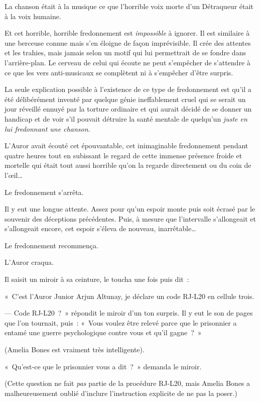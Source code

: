 La chanson était à la musique ce que l'horrible voix morte d'un Détraqueur était à la voix humaine.

Et cet horrible, horrible fredonnement est \emph{impossible} à ignorer. Il est similaire à une berceuse connue mais s'en éloigne de façon imprévisible. Il crée des attentes et les trahies, mais jamais selon un motif qui lui permettrait de se fondre dans l'arrière-plan. Le cerveau de celui qui écoute ne peut s'empêcher de s'attendre à ce que les vers anti-musicaux se complètent ni à s'empêcher d'être surpris.

La seule explication possible à l'existence de ce type de fredonnement est qu'il a été délibérément inventé par quelque génie ineffablement cruel qui se serait un jour réveillé ennuyé par la torture ordinaire et qui aurait décidé de se donner un handicap et de voir s'il pouvait détruire la santé mentale de quelqu'un \emph{juste en lui fredonnant une chanson.}

L'Auror avait écouté cet épouvantable, cet inimaginable fredonnement pendant quatre heures tout en subissant le regard de cette immense présence froide et mortelle qui était tout aussi horrible qu'on la regarde directement ou du coin de l'œil…

Le fredonnement s'arrêta.

Il y eut une longue attente. Assez pour qu'un espoir monte puis soit écrasé par le souvenir des déceptions précédentes. Puis, à mesure que l'intervalle s'allongeait et s'allongeait encore, cet espoir s'éleva de nouveau, inarrêtable…

Le fredonnement recommença.

L'Auror craqua.

Il saisit un miroir à sa ceinture, le toucha une fois puis dit~:

«~C'est l'Auror Junior Arjun Altunay, je déclare un code RJ-L20 en cellule trois.

--- Code RJ-L20~?~» répondit le miroir d'un ton surpris. Il y eut le son de pages que l'on tournait, puis~: «~Vous voulez être relevé parce que le prisonnier a entamé une guerre psychologique contre vous et qu'il gagne~?~»

(Amelia Bones est vraiment très intelligente).

«~Qu'est-ce que le prisonnier vous a dit~?~» demanda le miroir.

(Cette question ne fait \emph{pas} partie de la procédure RJ-L20, mais Amelia Bones a malheureusement oublié d'inclure l'instruction explicite de ne pas la poser.)

